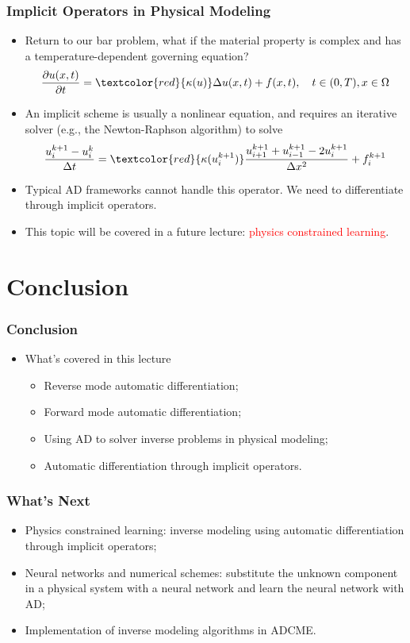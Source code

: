 \documentclass{beamer}
\newcommand{\red}[1]{\textcolor{red}{#1}}
\begin{document}
\begin{frame}
	\frametitle{Implicit Operators in Physical Modeling}
	\begin{itemize}
		\item Return to our bar problem, what if the material property is complex and has a temperature-dependent governing equation?
		$$\frac{\partial u({x}, t)}{\partial t} = \red{\kappa(u)}\Delta u({x}, t) + f({x}, t), \quad t\in (0,T), x\in \Omega$$
		\item An implicit scheme is usually a nonlinear equation, and requires an iterative solver (e.g., the Newton-Raphson algorithm) to solve
		$$\frac{u^{k+1}_i-u^k_i}{\Delta t} = \red{\kappa(u_i^{k+1})} \frac{u^{k+1}_{i+1}+u^{k+1}_{i-1}-2u^{k+1}_i}{\Delta x^2} + f_i^{k+1}$$
		\item Typical AD frameworks cannot handle this operator. We need to differentiate through implicit operators. 
		\item This topic will be covered in a future lecture: \red{physics constrained learning}. 
	\end{itemize}
	
\end{frame}



\section{Conclusion}

\begin{frame}
	\frametitle{Conclusion}
	
	\begin{itemize}
		\item What's covered in this lecture
		\begin{itemize}
		\item Reverse mode automatic differentiation;
		\item Forward mode automatic differentiation;
		\item Using AD to solver inverse problems in physical modeling;
		\item Automatic differentiation through implicit operators.
		\end{itemize}
	\end{itemize}
	
\end{frame}

\begin{frame}
	\frametitle{What's Next}
	
	\begin{itemize}
	\item Physics constrained learning: inverse modeling using automatic differentiation through implicit operators;
	\item Neural networks and numerical schemes: substitute the unknown component in a physical system with a neural network and learn the neural network with AD;
	\item Implementation of inverse modeling algorithms in ADCME. 
	\end{itemize}
\end{frame}
\end{document}
